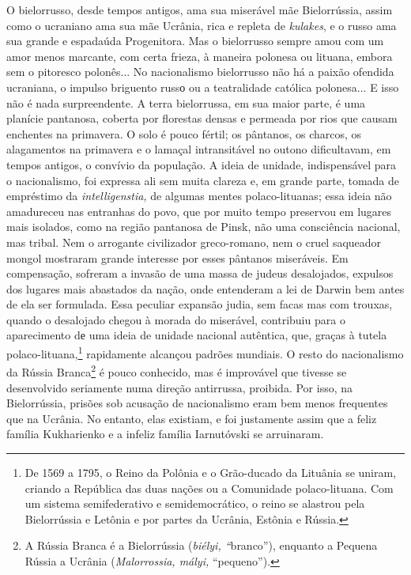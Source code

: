 O bielorrusso, desde tempos antigos, ama sua miserável mãe Bielorrússia,
assim como o ucraniano ama sua mãe Ucrânia, rica e repleta de
\emph{kulakes}, e o russo ama sua grande e espadaúda Progenitora. Mas o
bielorrusso sempre amou com um amor menos marcante, com certa frieza, à
maneira polonesa ou lituana, embora sem o pitoresco polonês... No
nacionalismo bielorrusso não há a paixão ofendida ucraniana, o impulso
briguento russо ou a teatralidade católica polonesa... E isso não é nada
surpreendente. A terra bielorrussa, em sua maior parte, é uma planície
pantanosa, coberta por florestas densas e permeada por rios que causam
enchentes na primavera. O solo é pouco fértil; os pântanos, os charcos,
os alagamentos na primavera e o lamaçal intransitável no outono
dificultavam, em tempos antigos, o convívio da população. A ideia de
unidade, indispensável para o nacionalismo, foi expressa ali sem muita
clareza e, em grande parte, tomada de empréstimo da
\emph{intelligenstia,} de algumas mentes polaco-lituanas; essa ideia não
amadureceu nas entranhas do povo, que por muito tempo preservou em
lugares mais isolados, como na região pantanosa de Pinsk, não uma
consciência nacional, mas tribal. Nem o arrogante civilizador
greco-romano, nem o cruel saqueador mongol mostraram grande interesse
por esses pântanos miseráveis. Em compensação, sofreram a invasão de uma
massa de judeus desalojados, expulsos dos lugares mais abastados da
nação, onde entenderam a lei de Darwin bem antes de ela ser formulada.
Essa peculiar expansão judia, sem facas mas com trouxas, quando o
desalojado chegou à morada do miserável, contribuiu para o aparecimento
dе uma ideia de unidade nacional autêntica, que, graças à tutela
polaco-lituana,\footnote{De 1569 a 1795, o Reino da Polônia e o
  Grão-ducado da Lituânia se uniram, criando a República das duas nações
  ou a Comunidade polaco-lituana. Com um sistema semifederativo e
  semidemocrático, o reino se alastrou pela Bielorrússia e Letônia e por
  partes da Ucrânia, Estônia e Rússia.} rapidamente alcançou padrões
mundiais. O resto do nacionalismo da Rússia Branca\footnote{A Rússia
  Branca é a Bielorrússia (\emph{biélyi, ``}branco''), enquanto a
  Pequena Rússia a Ucrânia (\emph{Malorrossia, mályi,} ``pequeno'').} é
pouco conhecido, mas é improvável que tivesse se desenvolvido seriamente
numa direção antirrussa, proibida. Por isso, na Bielorrússia, prisões
sob acusação de nacionalismo eram bem menos frequentes que na Ucrânia.
No entanto, elas existiam, e foi justamente assim que a feliz família
Kukharienko e a infeliz família Iarnutóvski se arruinaram.

